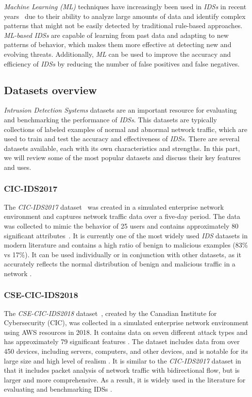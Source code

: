 \textit{Machine Learning (ML)} techniques have increasingly been used in \textit{IDSs} in recent
years~\cite{abdallah2022intrusion, thakkar2020review, maseer2021benchmarking} due to their ability to analyze large
amounts of data and identify complex patterns that might not be easily detected by traditional rule-based approaches.
\textit{ML-based IDSs} are capable of learning from past data and adapting to new patterns of behavior, which makes
them more effective at detecting new and evolving threats.
Additionally, \textit{ML} can be used to improve the accuracy and efficiency of \textit{IDSs} by reducing the number of
false positives and false negatives.

\subsection{Datasets overview}\label{subsec:datasets-overview}

\textit{Intrusion Detection Systems} datasets are an important resource for evaluating and benchmarking the performance
of \textit{IDSs}.
This datasets are typically collections of labeled examples of normal and abnormal network traffic, which are used to
train and test the accuracy and effectiveness of \textit{IDSs}.
There are several datasets available, each with its own characteristics and strengths.
In this part, we will review some of the most popular datasets and discuss their key features and uses.

\subsubsection{CIC-IDS2017}
The \textit{CIC-IDS2017} dataset~\cite{CICIDS2017} was created in a simulated enterprise network environment and captures
network traffic data over a five-day period.
The data was collected to mimic the behavior of 25 users and contains approximately 80 significant
attributes~\cite{RING2019147}.
It is currently one of the most widely used \textit{IDS} datasets in modern literature and contains a high ratio of
benign to malicious examples (83\% vs 17\%).
It can be used individually or in conjunction with other datasets, as it accurately reflects the normal distribution of
benign and malicious traffic in a network \cite{Shroff2022}.

\subsubsection{CSE-CIC-IDS2018}
The \textit{CSE-CIC-IDS2018} dataset~\cite{CSE-CIC-IDS2018}, created by the Canadian Institute for Cybersecurity (CIC),
was collected in a simulated enterprise network environment using AWS resources in 2018.
It contains data on seven different attack types and has approximately 79 significant features .
The dataset includes data from over 450 devices, including servers, computers, and other devices, and is notable for
its large size and high level of realism \cite{pujari2022comparative}.
It is similar to the \textit{CIC-IDS2017} dataset in that it includes packet analysis of network traffic with
bidirectional flow, but is larger and more comprehensive.
As a result, it is widely used in the literature for evaluating and benchmarking IDSs \cite{pujari2022comparative}.


